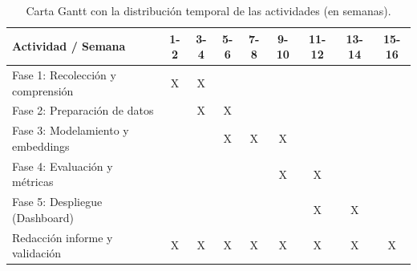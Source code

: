 \begin{table}[H]
    \centering
    \small
    \renewcommand{\baselinestretch}{1.0}\selectfont
    \caption{Carta Gantt con la distribución temporal de las actividades (en semanas).}
    \label{tab:carta_gantt}
    \captionsetup{skip=8pt}
    \begin{tabularx}{\textwidth}{>{\raggedright\arraybackslash}p{6cm} c c c c c c c c}
        \toprule
        \textbf{Actividad / Semana} & \textbf{1-2} & \textbf{3-4} & \textbf{5-6} & \textbf{7-8} & \textbf{9-10} & \textbf{11-12} & \textbf{13-14} & \textbf{15-16} \\
        \midrule
        Fase 1: Recolección y comprensión & \cellcolor{gray!40}X & \cellcolor{gray!40}X & & & & & & \\
        Fase 2: Preparación de datos & & \cellcolor{gray!40}X & \cellcolor{gray!40}X & & & & & \\
        Fase 3: Modelamiento y embeddings & & & \cellcolor{gray!40}X & \cellcolor{gray!40}X & \cellcolor{gray!40}X & & & \\
        Fase 4: Evaluación y métricas & & & & & \cellcolor{gray!40}X & \cellcolor{gray!40}X & & \\
        Fase 5: Despliegue (Dashboard) & & & & & & \cellcolor{gray!40}X & \cellcolor{gray!40}X & \\
        Redacción informe y validación & \cellcolor{gray!20}X & \cellcolor{gray!20}X & \cellcolor{gray!20}X & \cellcolor{gray!20}X & \cellcolor{gray!20}X & \cellcolor{gray!20}X & \cellcolor{gray!40}X & \cellcolor{gray!40}X \\
        \bottomrule
    \end{tabularx}
\end{table}

